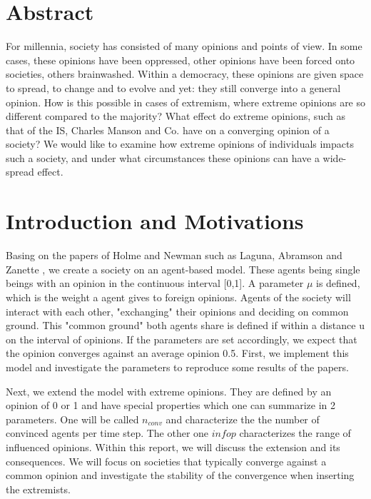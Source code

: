 \documentclass[11pt]{article}
\begin{document}




\tableofcontents

\newpage




\section{Abstract}
For millennia, society has consisted of many opinions and points of view. In some cases, these opinions have been oppressed, other opinions have been forced onto societies, others brainwashed. Within a democracy, these opinions are given space to spread, to change and to evolve and yet: they still converge into a general opinion. How is this possible in cases of extremism, where extreme opinions are so different compared to the majority? What effect do extreme opinions, such as that of the IS, Charles Manson and Co. have on a converging opinion of a society? We would like to examine how extreme opinions of individuals impacts such a society, and under what circumstances these opinions can have a wide-spread effect.


\section{Introduction and Motivations}
Basing on the papers of Holme and Newman \cite{Coevolutions} such as Laguna, Abramson and Zanette \cite{Minor}, we create a society on an agent-based model. These agents being single beings with an opinion in the continuous interval [0,1]. A parameter $\mu$ is defined, which is the weight a agent gives to foreign opinions. Agents of the society will interact with each other, "exchanging" their opinions and deciding on common ground. This "common ground" both agents share is defined if within a distance u on the interval of opinions. If the parameters are set accordingly, we expect that the opinion converges against an average opinion 0.5. First, we implement this model and investigate the parameters to reproduce some results of the papers.

Next, we extend the model with extreme opinions. They are defined by an opinion of 0 or 1 and have special properties which one can summarize in 2 parameters. One will be called $n_{conv}$ and characterize the the number of convinced agents per time step. The other one $infop$ characterizes the range of influenced opinions. Within this report, we will discuss the extension and its consequences. We will focus on societies that typically converge against a common opinion and investigate the stability of the convergence when inserting the extremists.
\end{document}
